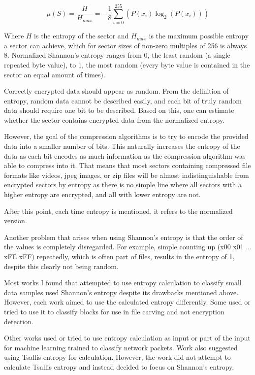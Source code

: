 \documentclass[
  digital, %
  color,   %
  oneside, %
  lof,     %
  nolot,     %
]{fithesis4}
\begin{document}
\begin{equation}
  \mu(S) = \frac{H}{H_{max}} = -\frac{1}{8}\sum_{i=0}^{255}(P(x_i)\log_2(P(x_i)))
  \label{eq:norm-entropy}
\end{equation}


Where $H$ is the entropy of the sector and $H_{max}$ is the maximum possible entropy a sector can achieve, which for sector sizes of non-zero multiples of 256 is always 8.
Normalized Shannon's entropy ranges from 0, the least random (a single repeated byte value), to 1, the most random (every byte value is contained in the sector an equal amount of times).

Correctly encrypted data should appear as random.
From the definition of entropy, random data cannot be described easily, and each bit of truly random data should require one bit to be described.
Based on this, one can estimate whether the sector contains encrypted data from the normalized entropy.

However, the goal of the compression algorithms is to try to encode the provided data into a smaller number of bits.
This naturally increases the entropy of the data as each bit encodes as much information as the compression algorithm was able to compress into it.
That means that most sectors containing compressed file formats like videos, jpeg images, or zip files will be almost indistinguishable from encrypted sectors by entropy as there is no simple line where all sectors with a higher entropy are encrypted, and all with lower entropy are not.

After this point, each time entropy is mentioned, it refers to the normalized version.

Another problem that arises when using Shannon's entropy is that the order of the values is completely disregarded. For example, simple counting up (x00 x01 ... xFE xFF) repeatedly, which is often part of files, results in the entropy of 1, despite this clearly not being random. 

Most works I found that attempted to use entropy calculation to classify small data samples used Shannon's entropy despite its drawbacks mentioned above.
However, each work aimed to use the calculated entropy differently.
Some used\cite{foster12} or tried to use\cite{garfmccar15} it to classify blocks for use in file carving and not encryption detection.

Other works used\cite{wazhguli11} or tried to use\cite{bebapeshrara18} entropy calculation as input or part of the input for machine learning trained to classify network packets.
Work\cite{wazhguli11} also suggested using Tsallis entropy for calculation.
However, the work did not attempt to calculate Tsallis entropy and instead decided to focus on Shannon's entropy.
\end{document}
